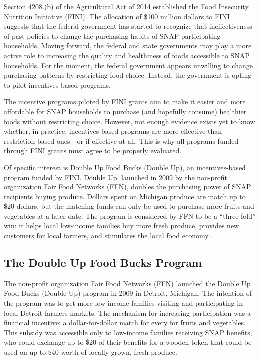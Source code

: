 \documentclass[12pt,letterpaperpaper,]{book}
\begin{document}
Section 4208.(b) of the Agricultural Act of 2014 established the Food
Insecurity Nutrition Initiative (FINI). The allocation of \$100 million
dollars to FINI suggests that the federal government has started to
recognize that ineffectiveness of past policies to change the purchasing
habits of SNAP participating households. Moving forward, the federal and
state governments may play a more active role to increasing the quality
and healthiness of foods accessible to SNAP households. For the moment,
the federal government appears unwilling to change purchasing patterns
by restricting food choice. Instead, the government is opting to pilot
incentives-based programs.

The incentive programs piloted by FINI grants aim to make it easier and
more affordable for SNAP households to purchase (and hopefully consume)
healthier foods without restricting choice. However, not enough evidence
exists yet to know whether, in practice, incentives-based programs are
more effective than restriction-based ones---or if effective at all.
This is why all programs funded through FINI grants must agree to be
properly evaluated.

Of specific interest is Double Up Food Bucks (Double Up), an
incentives-based program funded by FINI. Double Up, launched in 2009 by
the non-profit organization Fair Food Networks (FFN), doubles the
purchasing power of SNAP recipients buying produce. Dollars spent on
Michigan produce are match up to \$20 dollars, but the matching funds
can only be used to purchase more fruits and vegetables at a later date.
The program is considered by FFN to be a ``three-fold'' win: it helps
local low-income families buy more fresh produce, provides new customers
for local farmers, and stimulates the local food economy
\citep{fair_food_network_double_2014}.

\subsection*{The Double Up Food Bucks
Program}\label{the-double-up-food-bucks-program}

The non-profit organization Fair Food Networks (FFN) launched the Double
Up Food Bucks (Double Up) program in 2009 in Detroit, Michigan. The
intention of the program was to get more low-income families visiting
and participating in local Detroit farmers markets. The mechanism for
increasing participation was a financial incentive: a dollar-for-dollar
match for every for fruits and vegetables. This subsidy was accessible
only to low-income families receiving SNAP benefits, who could exchange
up to \$20 of their benefits for a wooden token that could be used on up
to \$40 worth of locally grown, fresh produce.
\end{document}
